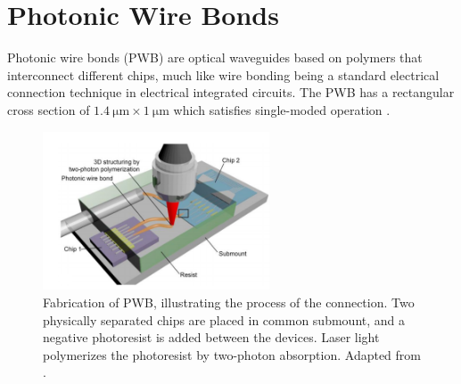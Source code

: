 






\clearpage
\section{Photonic Wire Bonds}

Photonic wire bonds (PWB) are optical waveguides based on polymers that interconnect different chips, much like wire bonding being a standard electrical connection technique in electrical integrated circuits. The PWB has a rectangular cross section of $\SI{1.4}{\micro\meter} \times \SI{1}{\micro\meter}$ which satisfies single-moded operation \cite{ToepferPWB14}.

\begin{figure}[!ht]
\centering
  \includegraphics[width=0.6\textwidth]{figs/PWB_fab}
  \caption{Fabrication of PWB, illustrating the process of the connection. Two physically separated chips are placed in common submount, and a negative photoresist is added between the devices. Laser light polymerizes the photoresist by two-photon absorption. Adapted from \cite{ToepferPWB14}.}
  \label{fig:PWB_fab}
\end{figure}

